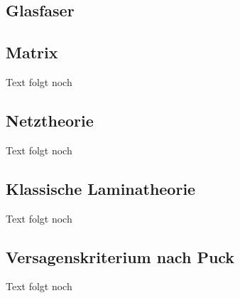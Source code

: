 \subsection{Glasfaser}

\subsection{Matrix}
Text folgt noch
\subsection{Netztheorie}
Text folgt noch
\subsection{Klassische Laminatheorie}
Text folgt noch
\subsection{Versagenskriterium nach Puck}
Text folgt noch